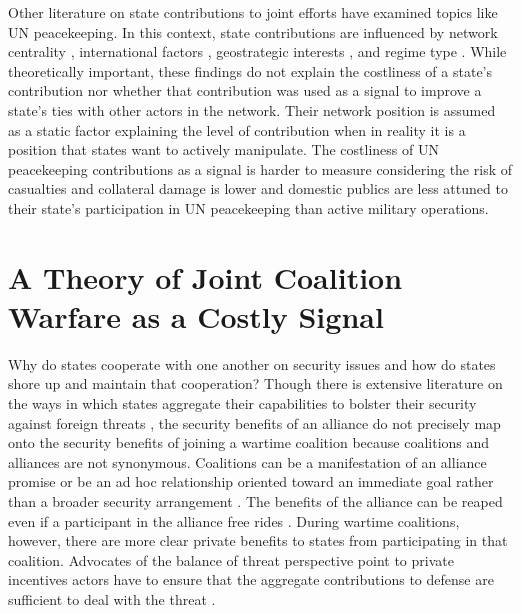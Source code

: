 \documentclass[12pt,letterpaper]{article}
\begin{document}
	Other literature on state contributions to joint efforts have examined topics like UN peacekeeping. In this context, state contributions are influenced by network centrality \citep{dorussen_networkedinternationalpolitics_2016}, international factors \citep{mullenbach_decidingkeeppeace_2005}, geostrategic interests \citep{baltrusaitis_friendsindeedcoalition_2008}, and regime type \citep{lebovic_unitingpeacedemocracies_2004}. While theoretically important, these findings do not explain the costliness of a state's contribution nor whether that contribution was used as a signal to improve a state's ties with other actors in the network. Their network position is assumed as a static factor explaining the level of contribution when in reality it is a position that states want to actively manipulate. The costliness of UN peacekeeping contributions as a signal is harder to measure considering the risk of casualties and collateral damage is lower and domestic publics are less attuned to their state's participation in UN peacekeeping than active military operations. 

\section{A Theory of Joint Coalition Warfare as a Costly Signal}
	Why do states cooperate with one another on security issues and how do states shore up and maintain that cooperation? Though there is extensive literature on the ways in which states aggregate their capabilities to bolster their security against foreign threats \citep{waltz_theoryinternationalpolitics_1979, walt_originsalliance_1987, morrow_alliancesasymmetryalternative_1991, conybeare_portfoliodiversificationmodel_1992}, the security benefits of an alliance do not precisely map onto the security benefits of joining a wartime coalition because coalitions and alliances are not synonymous. Coalitions can be a manifestation of an alliance promise or be an ad hoc relationship oriented toward an immediate goal rather than a broader security arrangement \citep[115]{weitsman_wartimealliancescoalition_2010}. The benefits of the alliance can be reaped even if a participant in the alliance free rides \citep{olson_economictheoryalliances_1966}. During wartime coalitions, however, there are more clear private benefits to states from participating in that coalition. Advocates of the balance of threat perspective point to private incentives actors have to ensure that the aggregate contributions to defense are sufficient to deal with the threat \citep{bennett_friendsneedburden_1997, baltrusaitis_coalitionpoliticsiraq_2010, davidson_neoclassicalrealistexplanation_2011}.
	
\end{document}

